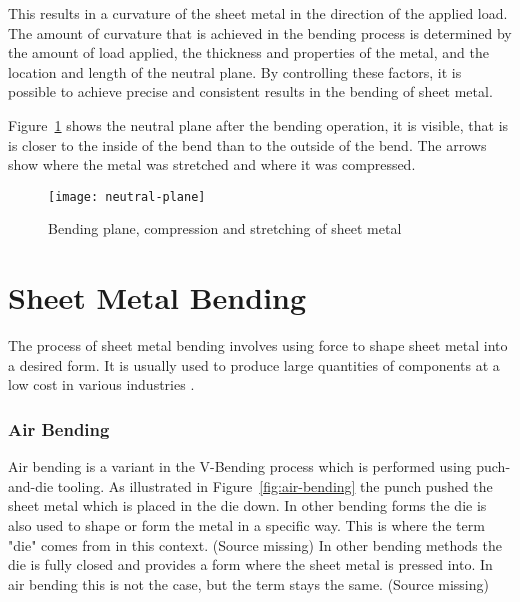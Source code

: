 This results in a curvature of the sheet metal in the direction of the applied load.
\cite[p. 3]{baig_machinelearningprediction_2021}
The amount of curvature that is achieved in the bending process is determined by the
amount of
load applied, the thickness and properties of the metal, and the location and length of
the
neutral plane. By controlling these factors, it is possible to achieve precise and
consistent
results in the bending of sheet metal.

Figure~\ref{fig:neutral-plane} shows the neutral plane after the bending operation, it is
visible, that is is closer to the inside of the bend than to the outside of the bend.
The arrows show where the metal was stretched and where it was compressed.


\begin{figure}[H]
    \centering
    \texttt{[image: neutral-plane]}
    \caption{Bending plane, compression and stretching of sheet metal \cite[p.
    3]{baig_machinelearningprediction_2021}}
    \label{fig:neutral-plane}
\end{figure}


\section{Sheet Metal Bending}\label{sec:sheet-metal-bending}
The process of sheet metal bending involves using force to shape sheet metal into a
desired form.
It is usually used to produce large quantities of components at a low cost in various
industries
\cite[p. 1]{dib_singleensembleclassifiers_2020}.

\subsubsection{Air Bending}
Air bending is a variant in the V-Bending process which is performed using puch-and-die
tooling.
\cite[p. 416]{groover_fundamentalsmodernmanufacturing_2020}
As illustrated in Figure~\ref{fig:air-bending} the punch pushed the sheet metal which
is placed
in the die down.
In other bending forms the die is also used to shape or form the metal in a specific
way. This is
where the term "die" comes from in this context. (Source missing)
In other bending methods the die is fully closed and provides a form where the sheet
metal is
pressed into. In air bending this is not the case, but the term stays the same. (Source
missing)

